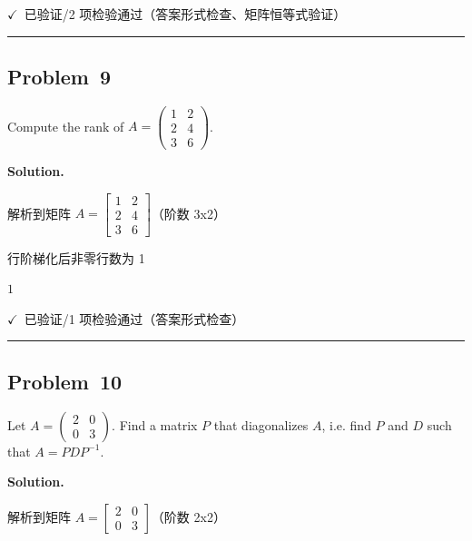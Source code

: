 \documentclass[12pt, a4paper]{article}
\newcommand{\problem}[1]{\subsection*{Problem~#1}}
\newcommand{\solution}{%
  \par\noindent
  {\color{solutiongreen}\bfseries Solution.}\par
}
\newcommand{\verifyok}{\textcolor{solutiongreen}{\ensuremath{\checkmark}\ 已验证}}
\begin{document}
\begin{verifybox}\small \verifyok{}/2 项检验通过（答案形式检查、矩阵恒等式验证） \end{verifybox}

\vspace{0.8em}\hrule\vspace{0.8em}

\problem{9}

\begin{stepbox}
Compute the rank of
$A = \begin{pmatrix} 1 & 2 \\ 2 & 4 \\ 3 & 6 \end{pmatrix}$.
\end{stepbox}

\solution

\begin{stepbox}
解析到矩阵 $A = \left[\begin{matrix}1 & 2\\2 & 4\\3 & 6\end{matrix}\right]$（阶数 3x2）
\end{stepbox}

\begin{stepbox}
行阶梯化后非零行数为 1
\end{stepbox}

\begin{center}
$\boxed{1}$
\end{center}

\begin{verifybox}\small \verifyok{}/1 项检验通过（答案形式检查） \end{verifybox}

\vspace{0.8em}\hrule\vspace{0.8em}

\problem{10}

\begin{stepbox}
Let $A = \begin{pmatrix} 2 & 0 \\ 0 & 3 \end{pmatrix}$. Find a matrix $P$ that diagonalizes
$A$, i.e. find $P$ and $D$ such that $A = PDP^{-1}$.
\end{stepbox}

\solution

\begin{stepbox}
解析到矩阵 $A = \left[\begin{matrix}2 & 0\\0 & 3\end{matrix}\right]$（阶数 2x2）
\end{stepbox}
\end{document}
